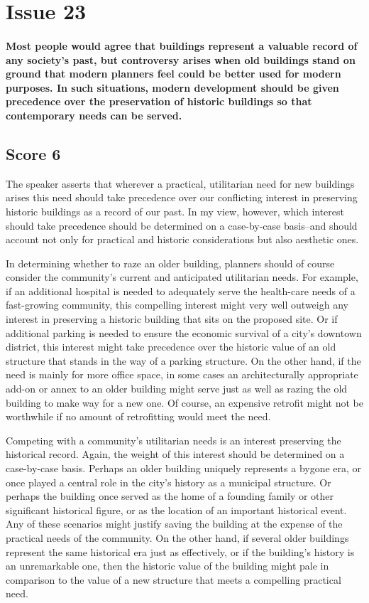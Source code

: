 \section{Issue 23}
\paragraph{
Most people would agree that buildings represent a valuable record of any society's past, but controversy arises when old buildings stand on ground that modern planners feel could be better used for modern purposes.
In such situations, modern development should be given precedence over the preservation of historic buildings so that contemporary needs can be served.
}
\subsection{Score 6}


The speaker asserts that wherever a practical, utilitarian need for new buildings arises this need should take precedence over our conflicting interest in preserving historic buildings as a record of our past.
In my view, however, which interest should take precedence should be determined on a case-by-case basis--and should account not only for practical and historic considerations but also aesthetic ones.


In determining whether to raze an older building, planners should of course consider the community's current and anticipated utilitarian needs.
For example, if an additional hospital is needed to adequately serve the health-care needs of a fast-growing community, this compelling interest might very well outweigh any interest in preserving a historic building that sits on the proposed site.
Or if additional parking is needed to ensure the economic survival of a city's downtown district, this interest might take precedence over the historic value of an old structure that stands in the way of a parking structure.
On the other hand, if the need is mainly for more office space, in some cases an architecturally appropriate add-on or annex to an older building might serve just as well as razing the old building to make way for a new one.
Of course, an expensive retrofit might not be worthwhile if no amount of retrofitting would meet the need.


Competing with a community's utilitarian needs is an interest preserving the historical record.
Again, the weight of this interest should be determined on a case-by-case basis.
Perhaps an older building uniquely represents a bygone era, or once played a central role in the city's history as a municipal structure.
Or perhaps the building once served as the home of a founding family or other significant historical figure, or as the location of an important historical event.
Any of these scenarios might justify saving the building at the expense of the practical needs of the community.
On the other hand, if several older buildings represent the same historical era just as effectively, or if the building's history is an unremarkable one, then the historic value of the building might pale in comparison to the value of a new structure that meets a compelling practical need.


